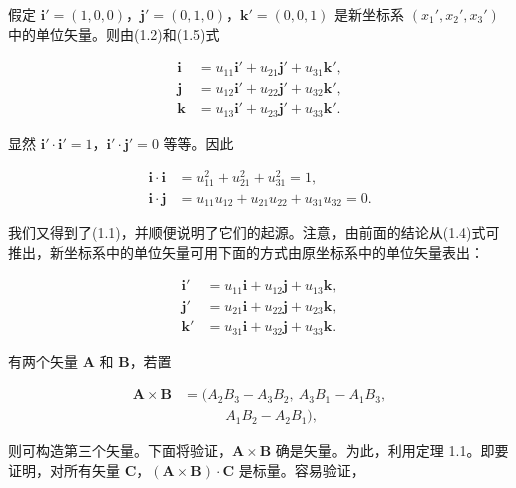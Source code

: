 \documentclass[11pt,a4paper,oneside]{ctexbook}
\newcommand{\ve}[1]{\bm{#1}}
\begin{document}
假定 $\ve{i}' = (1, 0, 0)$，$\ve{j}' = (0, 1, 0)$，$\ve{k}' = (0, 0, 1)$ 是新坐标系 $(x_1', x_2', x_3')$ 中的单位矢量。则由(1.2)和(1.5)式

\begin{equation}
\begin{aligned}
\ve{i} &= u_{11} \ve{i}' + u_{21} \ve{j}' + u_{31} \ve{k}',\\
\ve{j} &= u_{12} \ve{i}' + u_{22} \ve{j}' + u_{32} \ve{k}',\\
\ve{k} &= u_{13} \ve{i}' + u_{23} \ve{j}' + u_{33} \ve{k}'.
\end{aligned}
\tag{1.6}
\end{equation}

显然 $\ve{i}' \cdot \ve{i}' = 1$，$\ve{i}' \cdot \ve{j}' = 0$ 等等。因此

\begin{equation*}
\begin{aligned}
\ve{i} \cdot \ve{i} &= u_{11}^{2} + u_{21}^{2} + u_{31}^{2} = 1,\\
\ve{i} \cdot \ve{j} &= u_{11} u_{12} + u_{21} u_{22} + u_{31} u_{32} = 0.
\end{aligned}
\end{equation*}

我们又得到了(1.1)，并顺便说明了它们的起源。注意，由前面的结论从(1.4)式可推出，新坐标系中的单位矢量可用下面的方式由原坐标系中的单位矢量表出：

\begin{equation}
\begin{aligned}
\ve{i}' &= u_{11} \ve{i} + u_{12} \ve{j} + u_{13} \ve{k},\\
\ve{j}' &= u_{21} \ve{i} + u_{22} \ve{j} + u_{23} \ve{k},\\
\ve{k}' &= u_{31} \ve{i} + u_{32} \ve{j} + u_{33} \ve{k}.
\end{aligned}
\tag{1.7}
\end{equation}

有两个矢量 $\ve{A}$ 和 $\ve{B}$，若置

\begin{equation*}
\begin{aligned}
\ve{A} \times \ve{B} &= (A_2 B_3 - A_3 B_2,\ A_3 B_1 - A_1 B_3,\\
&\qquad\quad A_1 B_2 - A_2 B_1),
\end{aligned}
\end{equation*}

则可构造第三个矢量。下面将验证，$\ve{A} \times \ve{B}$ 确是矢量。为此，利用定理 1.1。即要证明，对所有矢量 $\ve{C}$，$(\ve{A} \times \ve{B}) \cdot \ve{C}$ 是标量。容易验证，
\end{document}
